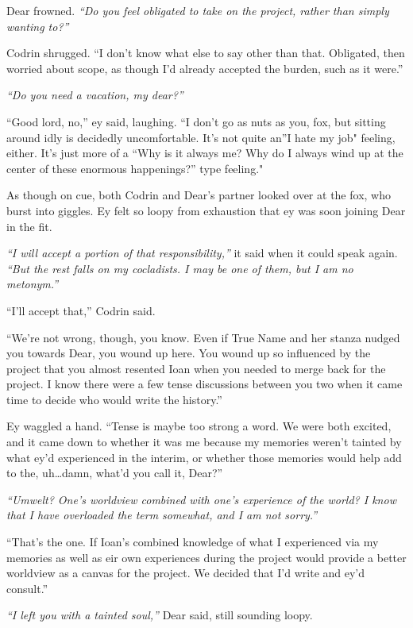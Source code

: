 Dear frowned. \emph{``Do you feel obligated to take on the project, rather than simply wanting to?''}

Codrin shrugged. ``I don't know what else to say other than that. Obligated, then worried about scope, as though I'd already accepted the burden, such as it were.''

\emph{``Do you need a vacation, my dear?''}

``Good lord, no,'' ey said, laughing. ``I don't go as nuts as you, fox, but sitting around idly is decidedly uncomfortable. It's not quite an''I hate my job" feeling, either. It's just more of a ``Why is it always me? Why do I always wind up at the center of these enormous happenings?'' type feeling."

As though on cue, both Codrin and Dear's partner looked over at the fox, who burst into giggles. Ey felt so loopy from exhaustion that ey was soon joining Dear in the fit.

\emph{``I will accept a portion of that responsibility,''} it said when it could speak again. \emph{``But the rest falls on my cocladists. I may be one of them, but I am no metonym.''}

``I'll accept that,'' Codrin said.

``We're not wrong, though, you know. Even if True Name and her stanza nudged you towards Dear, you wound up here. You wound up so influenced by the project that you almost resented Ioan when you needed to merge back for the project. I know there were a few tense discussions between you two when it came time to decide who would write the history.''

Ey waggled a hand. ``Tense is maybe too strong a word. We were both excited, and it came down to whether it was me because my memories weren't tainted by what ey'd experienced in the interim, or whether those memories would help add to the, uh\ldots damn, what'd you call it, Dear?''

\emph{``\emph{Umwelt}? One's worldview combined with one's experience of the world? I know that I have overloaded the term somewhat, and I am not sorry.''}

``That's the one. If Ioan's combined knowledge of what I experienced via my memories as well as eir own experiences during the project would provide a better worldview as a canvas for the project. We decided that I'd write and ey'd consult.''

\emph{``I left you with a tainted soul,''} Dear said, still sounding loopy.

